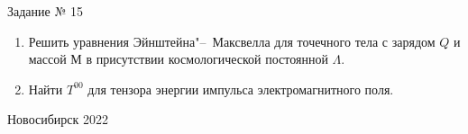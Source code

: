 \documentclass[12pt,pagesize,paper=192mm:108mm,landscape]{scrbook}
\begin{document}
\begin{titlepage}
  \vspace*{-0.5em}
  \begin{center}    




    \vfill
    \Large
    Задание № 15
 \bigskip

    \normalsize
    \begin{minipage}{0.65\linewidth}
      \begin{enumerate}
      \item Решить уравнения Эйнштейна"--~Максвелла для точечного тела
        с зарядом $Q$ и массой $М$ в присутствии космологической
        постоянной $\Lambda$.
      \item Найти $T^{00}$ для тензора энергии импульса электромагнитного
        поля.
      \end{enumerate}
    \end{minipage}
    \vfill

     \normalsize \ccbysa\hspace{0.5em}  Новосибирск 2022
  \end{center}
\end{titlepage}
\end{document}
